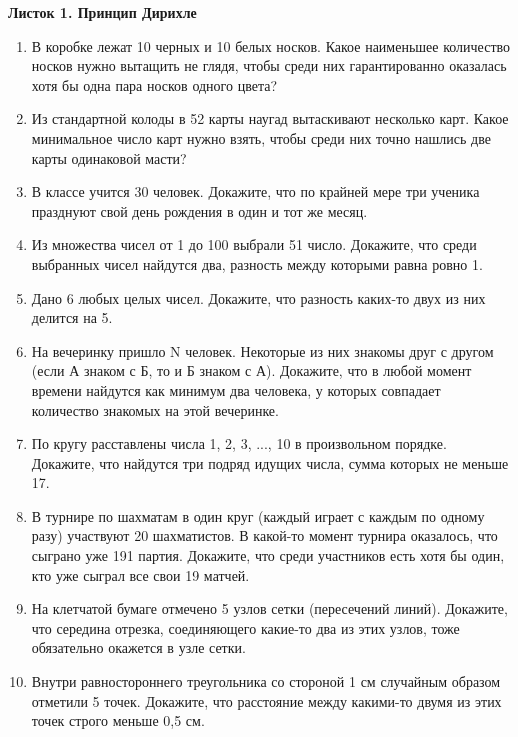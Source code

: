 \documentclass[12pt,a4paper]{article}
\begin{document}
\begin{center}
    {\large\bf Листок 1. Принцип Дирихле} \\
\end{center}

\vspace{5mm}

\begin{enumerate}
    \item В коробке лежат 10 черных и 10 белых носков. Какое наименьшее количество носков нужно вытащить не глядя, чтобы среди них гарантированно оказалась хотя бы одна пара носков одного цвета?
    
    \item Из стандартной колоды в 52 карты наугад вытаскивают несколько карт. Какое минимальное число карт нужно взять, чтобы среди них точно нашлись две карты одинаковой масти?
    
    \item В классе учится 30 человек. Докажите, что по крайней мере три ученика празднуют свой день рождения в один и тот же месяц.

    \item Из множества чисел от 1 до 100 выбрали 51 число. Докажите, что среди выбранных чисел найдутся два, разность между которыми равна ровно 1.

    \item Дано 6 любых целых чисел. Докажите, что разность каких-то двух из них делится на 5.

    \item На вечеринку пришло N человек. Некоторые из них знакомы друг с другом (если А знаком с Б, то и Б знаком с А). Докажите, что в любой момент времени найдутся как минимум два человека, у которых совпадает количество знакомых на этой вечеринке.

    \item По кругу расставлены числа 1, 2, 3, ..., 10 в произвольном порядке. Докажите, что найдутся три подряд идущих числа, сумма которых не меньше 17.

    \item В турнире по шахматам в один круг (каждый играет с каждым по одному разу) участвуют 20 шахматистов. В какой-то момент турнира оказалось, что сыграно уже 191 партия. Докажите, что среди участников есть хотя бы один, кто уже сыграл все свои 19 матчей.

    \item На клетчатой бумаге отмечено 5 узлов сетки (пересечений линий). Докажите, что середина отрезка, соединяющего какие-то два из этих узлов, тоже обязательно окажется в узле сетки.
    
    \item Внутри равностороннего треугольника со стороной 1 см случайным образом отметили 5 точек. Докажите, что расстояние между какими-то двумя из этих точек строго меньше 0,5 см.
\end{enumerate}
\end{document}
